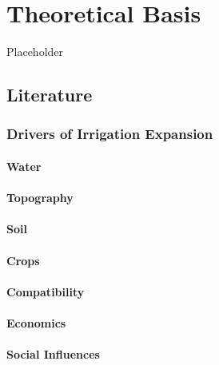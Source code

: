 \documentclass[12pt,twoside]{reedthesis}
\begin{document}
\hypertarget{Theory}{%
\chapter{Theoretical Basis}\label{Theory}}

Placeholder

\hypertarget{lit}{%
\section{Literature}\label{lit}}

\hypertarget{drivers}{%
\subsection{Drivers of Irrigation Expansion}\label{drivers}}

\hypertarget{water}{%
\subsubsection{Water}\label{water}}

\hypertarget{topo}{%
\subsubsection{Topography}\label{topo}}

\hypertarget{soil}{%
\subsubsection{Soil}\label{soil}}

\hypertarget{crops}{%
\subsubsection{Crops}\label{crops}}

\hypertarget{combatibility}{%
\subsubsection{Compatibility}\label{combatibility}}

\hypertarget{econ}{%
\subsubsection{Economics}\label{econ}}

\hypertarget{socinf}{%
\subsubsection{Social Influences}\label{socinf}}
\end{document}

